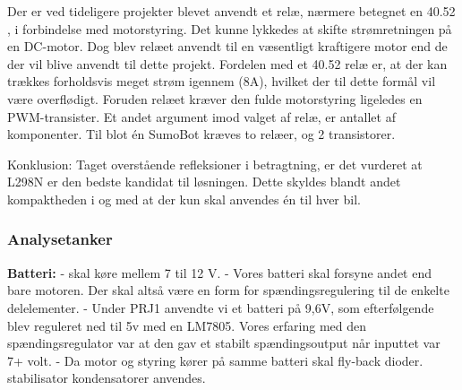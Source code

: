 Der er ved tideligere projekter blevet anvendt et relæ, nærmere betegnet en 40.52 \cite{40.52}, i forbindelse med motorstyring. Det kunne lykkedes at skifte strømretningen på en DC-motor. Dog blev relæet anvendt til en væsentligt kraftigere motor end de der vil blive anvendt til dette projekt. Fordelen med et 40.52 relæ er, at der kan trækkes forholdsvis meget strøm igennem (8A), hvilket der til dette formål vil være overflødigt. Foruden relæet kræver den fulde motorstyring ligeledes en PWM-transister. %
Et andet argument imod valget af relæ, er antallet af komponenter. Til blot én SumoBot kræves to relæer, og 2 transistorer.

Konklusion:
Taget overstående refleksioner i betragtning, er det vurderet at L298N er den bedste kandidat til løsningen. Dette skyldes blandt andet kompaktheden i og med at der kun skal anvendes én til hver bil.

\subsubsection{Analysetanker}

\textbf{Batteri:}
- skal køre mellem 7 til 12 V.
- Vores batteri skal forsyne andet end bare motoren. Der skal altså være en form for spændingsregulering til de enkelte delelementer.
- Under PRJ1 anvendte vi et batteri på 9,6V, som efterfølgende blev reguleret ned til 5v med en LM7805\cite{LM78xxData}. Vores erfaring med den spændingsregulator var at den gav et stabilt spændingsoutput når inputtet var 7+ volt.
- Da motor og styring kører på samme batteri skal fly-back dioder. stabilisator kondensatorer anvendes.

